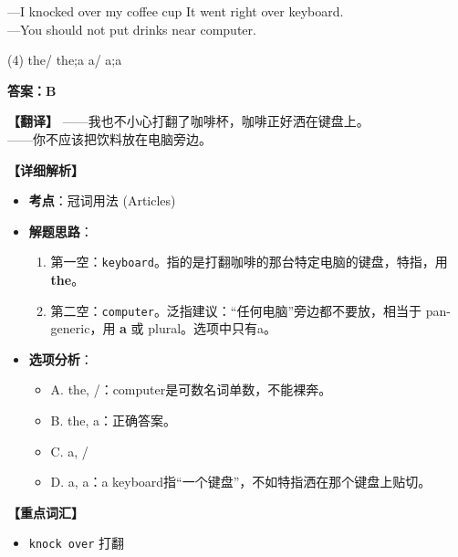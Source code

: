\documentclass[11pt, a4paper]{article}
\newcommand{\analysis}[4]{
    \begin{solutionbox}
        \textbf{答案：#1}
        
        \textbf{【翻译】} #2
        
        \textbf{【详细解析】}
        #3
        
        \textbf{【重点词汇】}
        #4
    \end{solutionbox}
}
\newcommand{\blank}{\underline{\hspace{1.5cm}}}
\begin{document}
\begin{questions}
    \item ---I knocked over my coffee cup It went right over \blank keyboard. \\
    ---You should not put drinks near \blank computer.
    \begin{tasks}(4)
        \task the/ \task the;a \task a/ \task a;a
    \end{tasks}
    \analysis{B}{——我也不小心打翻了咖啡杯，咖啡正好洒在键盘上。\\——你不应该把饮料放在电脑旁边。}{
        \begin{itemize}
            \item \textbf{考点}：冠词用法 (Articles)
            \item \textbf{解题思路}：
                \begin{enumerate}
                    \item 第一空：\texttt{keyboard}。指的是打翻咖啡的那台特定电脑的键盘，特指，用 \textbf{the}。
                    \item 第二空：\texttt{computer}。泛指建议：“任何电脑”旁边都不要放，相当于 pan-generic，用 \textbf{a} 或 plural。选项中只有a。
                \end{enumerate}
            \item \textbf{选项分析}：
                \begin{itemize}
                    \item A. the, /：computer是可数名词单数，不能裸奔。
                    \item B. the, a：正确答案。
                    \item C. a, /
                    \item D. a, a：a keyboard指“一个键盘”，不如特指洒在那个键盘上贴切。
                \end{itemize}
        \end{itemize}
    }{
        \begin{itemize}
            \item \texttt{knock over} 打翻
        \end{itemize}
    }
\end{questions}

\end{document}
